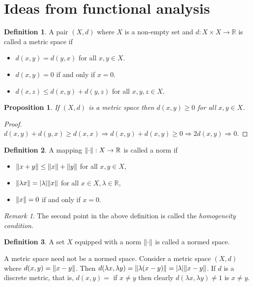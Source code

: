 \documentclass{article}
\DeclarePairedDelimiter\norm{\lVert}{\rVert}
\theoremstyle{plain}
\numberwithin{thm}{section}
\theoremstyle{plain}
\newtheorem{prop}{Proposition}
\numberwithin{prop}{section}
\theoremstyle{definition}
\newtheorem{defn}{Definition}
\numberwithin{defn}{section}
\theoremstyle{remark}
\newtheorem*{rem}{Remark}
\numberwithin{equation}{section}
\begin{document}
\section{Ideas from functional analysis}\label{s22}
\begin{defn}\label{s22d1}
A pair $(X, d)$ where $X$ is a non-empty set and $d: X \times X \rightarrow \mathbb{R}$ is called a metric space if
\begin{itemize}
\item $d(x, y) = d(y, x)$ for all $x, y \in X$.
\item $d(x, y) = 0$ if and only if $x = 0$.
\item $d(x, z) \le d(x, y) + d(y, z)$ for all $x, y, z \in X$.
\end{itemize}
\end{defn}

\begin{prop}\label{s22p1}
If $(X, d)$ is a metric space then $d(x, y) \ge 0$ for all $x, y \in X$.
\end{prop}
\begin{proof}
$d(x, y) + d(y, x) \ge d(x, x) \Rightarrow d(x, y) + d(x, y) \ge 0 \Rightarrow 2d(x, y) \Rightarrow 0$.
\end{proof}

\begin{defn}\label{s22d2}
A mapping $\norm{\cdot}: X \rightarrow \mathbb{R}$ is called a norm if
\begin{itemize}
\item $\norm{x + y} \le \norm{x} + \norm{y}$ for all $x, y \in X$,
\item $\norm{\lambda x} = |\lambda|\norm{x}$ for all $x \in X, \lambda \in \mathbb{R}$,
\item $\norm{x} = 0$ if and only if $x = 0$.
\end{itemize}
\end{defn}

\begin{rem}
The second point in the above definition is called the \emph{homogeneity condition}.
\end{rem}

\begin{defn}\label{s22d3}
A set $X$ equipped with a norm $\norm{\cdot}$ is called a normed space.
\end{defn}

A metric space need not be a normed space. Consider a metric space $(X, d)$ where $d(x, y) = \norm{x - y}$. Then
$d(\lambda x, \lambda y) = \norm{\lambda(x - y)} = |\lambda|\norm{x - y}$. If $d$ is a discrete metric, that is, 
$d(x, y) = $ if $x \ne y$ then clearly $d(\lambda x, \lambda y) \ne 1$ is $x \ne y$.
\end{document}
